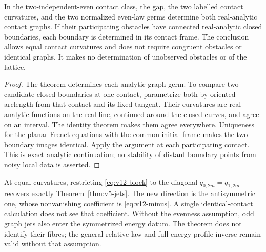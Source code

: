 \begin{corollary}
\label{cor:v12-analytic-boundaries}
In the two-independent-even contact class, the gap, the two labelled
contact curvatures, and the two normalized even-law germs determine
both real-analytic contact graphs. If their participating obstacles
have connected real-analytic closed boundaries, each boundary is
determined in its contact frame. The conclusion allows equal contact
curvatures and does not require congruent obstacles or identical graphs.
It makes no determination of unobserved obstacles or of the lattice.
\end{corollary}
\begin{proof}
The theorem determines each analytic graph germ. To compare two
candidate closed boundaries at one contact, parametrize both by
oriented arclength from that contact and its fixed tangent. Their
curvatures are real-analytic functions on the real line, continued
around the closed curves, and agree on an interval. The identity
theorem makes them agree everywhere. Uniqueness for the planar Frenet
equations with the common initial frame makes the two boundary images
identical. Apply the argument at each participating contact. This is
exact analytic continuation; no stability of distant boundary points
from noisy local data is asserted.
\end{proof}

At equal curvatures, restricting \eqref{eq:v12-block} to the diagonal
$q_{0,2m}=q_{1,2m}$ recovers exactly
Theorem~\ref{thm:v5-jets}. The new direction is the antisymmetric
one, whose nonvanishing coefficient is \eqref{eq:v12-minus}.
A single identical-contact calculation does not see that coefficient.
Without the evenness assumption, odd graph jets also enter the
symmetrized energy datum. The theorem does not identify their fibres;
the general relative law and full energy-profile inverse remain valid
without that assumption.
